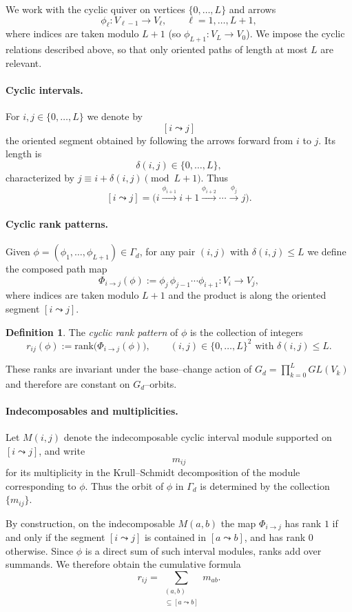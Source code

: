 \documentclass{article}
\theoremstyle{definition}
\newtheorem{definition}[theorem]{Definition}
\begin{document}
We work with the cyclic quiver on vertices $\{0,\dots,L\}$ and arrows
\[
\phi_\ell : V_{\ell-1} \longrightarrow V_\ell,
\qquad \ell=1,\dots,L+1,
\]
where indices are taken modulo $L+1$ (so $\phi_{L+1}:V_L\to V_0$). We impose the cyclic relations described above, so that only oriented paths of length at most $L$ are relevant.

\paragraph{Cyclic intervals.}
For $i,j\in\{0,\dots,L\}$ we denote by
\[
[i\leadsto j]
\]
the oriented segment obtained by following the arrows forward from $i$ to $j$. Its length is
\[
\delta(i,j)\in\{0,\dots,L\},
\]
characterized by $j \equiv i+\delta(i,j)\pmod{L+1}$. Thus
\[
[i\leadsto j]
=
\bigl(
i \xrightarrow{\phi_{i+1}} i+1 \xrightarrow{\phi_{i+2}} \cdots
\xrightarrow{\phi_{j}} j
\bigr).
\]

\paragraph{Cyclic rank patterns.}
Given $\phi=(\phi_1,\dots,\phi_{L+1})\in\Gamma_d$, for any pair $(i,j)$ with $\delta(i,j)\le L$ we define the composed path map
\[
\Phi_{i\to j}(\phi)
:=
\phi_{j}\,\phi_{j-1}\cdots \phi_{i+1}
:
V_i \longrightarrow V_j,
\]
where indices are taken modulo $L+1$ and the product is along the oriented segment $[i\leadsto j]$.

\begin{definition}
The \emph{cyclic rank pattern} of $\phi$ is the collection of integers
\[
r_{ij}(\phi)
:=
\mathrm{rank}\bigl(\Phi_{i\to j}(\phi)\bigr),
\qquad
(i,j)\in\{0,\dots,L\}^2
\text{ with }\delta(i,j)\le L.
\]
\end{definition}

These ranks are invariant under the base–change action of
$G_d=\prod_{k=0}^L GL(V_k)$ and therefore are constant on $G_d$–orbits.

\paragraph{Indecomposables and multiplicities.}
Let $M(i,j)$ denote the indecomposable cyclic interval module supported on
$[i\leadsto j]$, and write
\[
m_{ij}
\]
for its multiplicity in the Krull–Schmidt decomposition of the module
corresponding to $\phi$. Thus the orbit of $\phi$ in $\Gamma_d$
is determined by the collection $\{m_{ij}\}$.

By construction, on the indecomposable $M(a,b)$ the map
$\Phi_{i\to j}$ has rank $1$ if and only if the segment
$[i\leadsto j]$ is contained in $[a\leadsto b]$, and has rank $0$
otherwise. Since $\phi$ is a direct sum of such interval modules,
ranks add over summands. We therefore obtain the cumulative formula
\begin{equation}\label{eq:cyclic-rank-forward}
r_{ij}
=
\sum_{\substack{(a,b)\\ [i\leadsto j]\subseteq [a\leadsto b]}}
m_{ab}.
\end{equation}
\end{document}
